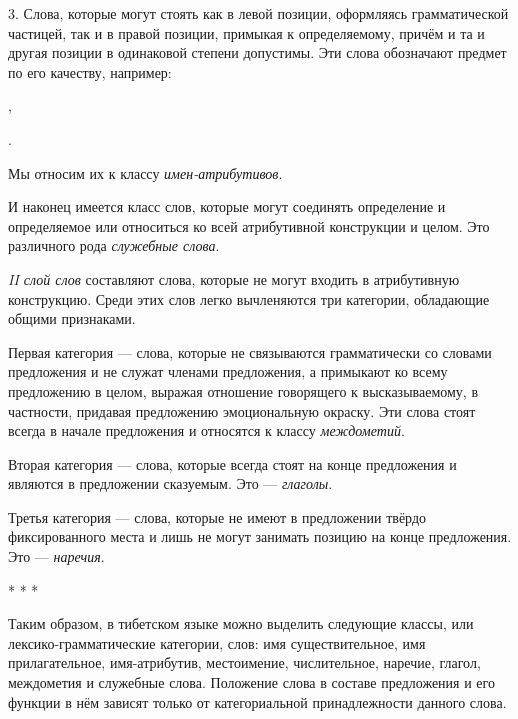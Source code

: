 3. Слова, которые могут стоять как в левой позиции, оформляясь грамматической частицей, так и в правой позиции, примыкая к определяемому, причём и та и другая позиции в одинаковой степени допустимы. Эти слова обозначают предмет по его качеству, например:
\begin{prfsample}
    \item {},
    \item {}.    
\end{prfsample}

Мы относим их к классу \emph{имен-атрибутивов}.

И наконец имеется класс слов, которые могут соединять определение и определяемое или относиться ко всей атрибутивной конструкции и целом. Это различного рода \emph{служебные слова}.

\emph{II слой слов} составляют слова, которые не могут входить в атрибутивную конструкцию. Среди этих слов легко вычленяются три категории, обладающие общими признаками.

Первая категория --- слова, которые не связываются грамматически со словами предложения и не служат членами предложения, а примыкают ко всему предложению в целом, выражая отношение говорящего к высказываемому, в частности, придавая предложению эмоциональную окраску. Эти слова стоят всегда в начале предложения и относятся к классу \emph{междометий}.

Вторая категория --- слова, которые всегда стоят на конце предложения и являются в предложении сказуемым. Это --- \emph{глаголы}.

Третья категория --- слова, которые не имеют в предложении твёрдо фиксированного места и лишь не могут занимать позицию на конце предложения. Это --- \emph{наречия}.

\begin{center}
* * *
\end{center}

Таким образом, в тибетском языке можно выделить следующие классы, или лексико-грамматические категории, слов: имя существительное, имя прилагательное, имя-атрибутив, местоимение, числительное, наречие, глагол, междометия и служебные слова. Положение слова в составе предложения и его функции в нём зависят только от категориальной принадлежности данного слова.